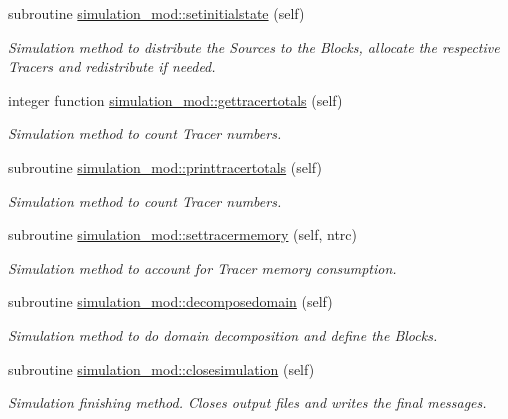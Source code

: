 \begin{DoxyCompactItemize}
subroutine \mbox{\hyperlink{namespacesimulation__mod_a447c6d709de6aa360a65d39d660e627b}{simulation\+\_\+mod\+::setinitialstate}} (self)
\begin{DoxyCompactList}\small\item\em Simulation method to distribute the Sources to the Blocks, allocate the respective Tracers and redistribute if needed. \end{DoxyCompactList}\item 
integer function \mbox{\hyperlink{namespacesimulation__mod_a0ad485eab624ffa4df282f1da8d9f214}{simulation\+\_\+mod\+::gettracertotals}} (self)
\begin{DoxyCompactList}\small\item\em Simulation method to count Tracer numbers. \end{DoxyCompactList}\item 
subroutine \mbox{\hyperlink{namespacesimulation__mod_aba126a8e0575cabb3bef6ab395002b3c}{simulation\+\_\+mod\+::printtracertotals}} (self)
\begin{DoxyCompactList}\small\item\em Simulation method to count Tracer numbers. \end{DoxyCompactList}\item 
subroutine \mbox{\hyperlink{namespacesimulation__mod_acc5fa823c8dd599de8feda8988c224f2}{simulation\+\_\+mod\+::settracermemory}} (self, ntrc)
\begin{DoxyCompactList}\small\item\em Simulation method to account for Tracer memory consumption. \end{DoxyCompactList}\item 
subroutine \mbox{\hyperlink{namespacesimulation__mod_a2b8198a9fb3f7671c6b45192a0b9740c}{simulation\+\_\+mod\+::decomposedomain}} (self)
\begin{DoxyCompactList}\small\item\em Simulation method to do domain decomposition and define the Blocks. \end{DoxyCompactList}\item 
subroutine \mbox{\hyperlink{namespacesimulation__mod_a4285722eaa589fa671233554b54c74f8}{simulation\+\_\+mod\+::closesimulation}} (self)
\begin{DoxyCompactList}\small\item\em Simulation finishing method. Closes output files and writes the final messages. \end{DoxyCompactList}\end{DoxyCompactItemize}
